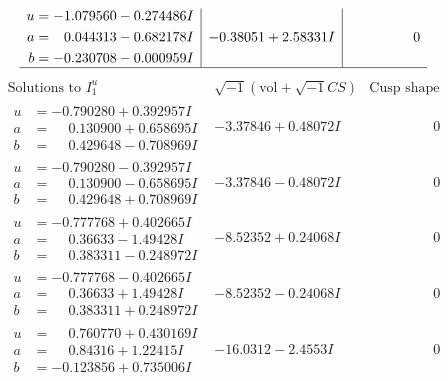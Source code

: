\documentclass[1p]{elsarticle_modified}
\theoremstyle{definition}
\newcommand{\I}{\sqrt{-1}}
\begin{document}
$$\begin{array}{c|c|c}
\begin{aligned}
u &= -1.079560 - 0.274486 I \\
a &= \phantom{-}0.044313 - 0.682178 I \\
b &= -0.230708 - 0.000959 I\end{aligned}
 & -0.38051 + 2.58331 I & \phantom{-0.000000 } 0\\
 \hline 
 \end{array}$$\newpage$$\begin{array}{c|c|c}  
\text{Solutions to }I^u_{1}& \I (\text{vol} + \sqrt{-1}CS) & \text{Cusp shape}\\
 \hline 
\begin{aligned}
u &= -0.790280 + 0.392957 I \\
a &= \phantom{-}0.130900 + 0.658695 I \\
b &= \phantom{-}0.429648 - 0.708969 I\end{aligned}
 & -3.37846 + 0.48072 I & \phantom{-0.000000 } 0 \\ \hline\begin{aligned}
u &= -0.790280 - 0.392957 I \\
a &= \phantom{-}0.130900 - 0.658695 I \\
b &= \phantom{-}0.429648 + 0.708969 I\end{aligned}
 & -3.37846 - 0.48072 I & \phantom{-0.000000 } 0 \\ \hline\begin{aligned}
u &= -0.777768 + 0.402665 I \\
a &= \phantom{-}0.36633 - 1.49428 I \\
b &= \phantom{-}0.383311 - 0.248972 I\end{aligned}
 & -8.52352 + 0.24068 I & \phantom{-0.000000 } 0 \\ \hline\begin{aligned}
u &= -0.777768 - 0.402665 I \\
a &= \phantom{-}0.36633 + 1.49428 I \\
b &= \phantom{-}0.383311 + 0.248972 I\end{aligned}
 & -8.52352 - 0.24068 I & \phantom{-0.000000 } 0 \\ \hline\begin{aligned}
u &= \phantom{-}0.760770 + 0.430169 I \\
a &= \phantom{-}0.84316 + 1.22415 I \\
b &= -0.123856 + 0.735006 I\end{aligned}
 & -16.0312 - 2.4553 I & \phantom{-0.000000 } 0 \\ \hline\begin{aligned}

\end{aligned}
\end{array}$$
\end{document}
